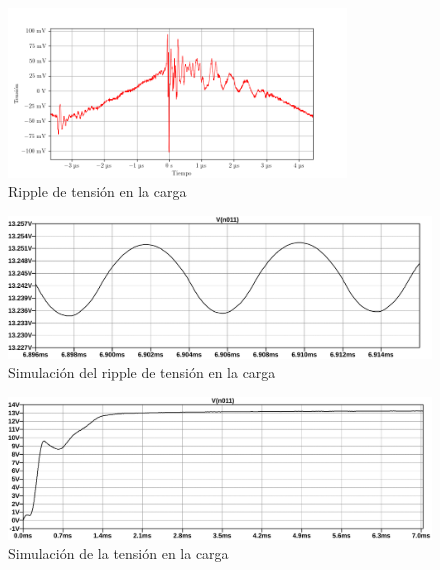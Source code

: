 
\begin{figure}[H]
    \centering
    \includegraphics[width=0.8\textwidth]{images/capturas-osciloscopio/17-11-2022/58.png}
    \caption{Ripple de tensión en la carga}
    \label{fig:osc:58}
\end{figure}

\begin{figure}[H]
    \centering
    \includegraphics[width=\textwidth]{images/sim/21-ripple.pdf}
    \caption{Simulación del ripple de tensión en la carga}
    \label{fig:sim:21ripple}
\end{figure}

\begin{figure}[H]
    \centering
    \includegraphics[width=\textwidth]{images/sim/21.pdf}
    \caption{Simulación de la tensión en la carga}
    \label{fig:sim:21}
\end{figure}
